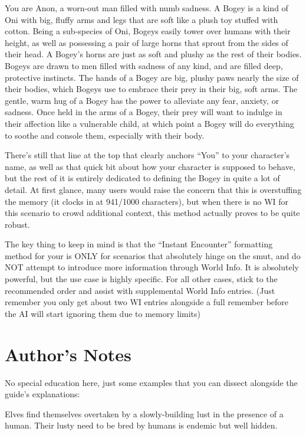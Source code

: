 \documentclass[Coomer-main.tex]{subfiles}
\begin{document}
\begin{/rm}
You are Anon, a worn-out man filled with numb sadness.
\smallskip
A Bogey is a kind of Oni with big, fluffy arms and legs that are soft like a plush toy stuffed with cotton. Being a sub-species of Oni, Bogeys easily tower over humans with their height, as well as possessing a pair of large horns that sprout from the sides of their head. A Bogey's horns are just as soft and plushy as the rest of their bodies. Bogeys are drawn to men filled with sadness of any kind, and are filled deep, protective instincts. The hands of a Bogey are big, plushy paws nearly the size of their bodies, which Bogeys use to embrace their prey in their big, soft arms. The gentle, warm hug of a Bogey has the power to alleviate any fear, anxiety, or sadness. Once held in the arms of a Bogey, their prey will want to indulge in their affection like a vulnerable child, at which point a Bogey will do everything to soothe and console them, especially with their body.
\end{/rm}

There’s still that line at the top that clearly anchors “You” to your character’s name, as well as that quick bit about how your character is supposed to behave, but the rest of it is entirely dedicated to defining the Bogey in quite a lot of detail. At first glance, many users would raise the concern that this is overstuffing the memory (it clocks in at 941/1000 characters), but when there is no WI for this scenario to crowd additional context, this method actually proves to be quite robust.

The key thing to keep in mind is that the “Instant Encounter” formatting method for your \rem is ONLY for scenarios that absolutely hinge on the smut, and do NOT attempt to introduce more information through World Info. It is absolutely powerful, but the use case is highly specific. For all other cases, stick to the recommended order and assist with supplemental World Info entries. (Just remember you only get about two WI entries alongside a full remember before the AI will start ignoring them due to memory limits)

\section{Author’s Notes}

No special education here, just some examples that you can dissect alongside the guide’s explanations:

\begin{/an}
Elves find themselves overtaken by a slowly-building lust in the presence of a human. Their lusty need to be bred by humans is endemic but well hidden.
\end{/an}
\end{document}
